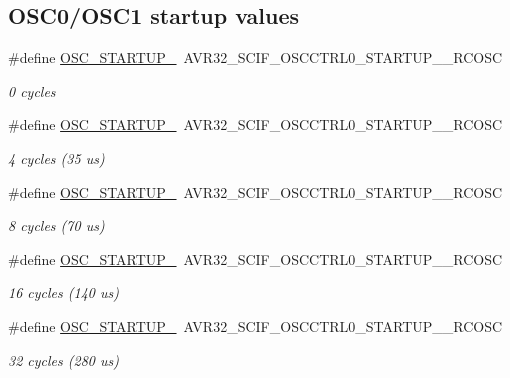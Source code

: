 \subsection*{\-O\-S\-C0/\-O\-S\-C1 startup values}
\begin{DoxyCompactItemize}
\item 
\#define \hyperlink{group__osc__group_ga9ae6e8400cfa38e2206501d313df0bd7}{\-O\-S\-C\-\_\-\-S\-T\-A\-R\-T\-U\-P\-\_}~\-A\-V\-R32\-\_\-\-S\-C\-I\-F\-\_\-\-O\-S\-C\-C\-T\-R\-L0\-\_\-\-S\-T\-A\-R\-T\-U\-P\-\_\-\_\-\-R\-C\-O\-S\-C
\begin{DoxyCompactList}\small\item\em 0 cycles \end{DoxyCompactList}\item 
\#define \hyperlink{group__osc__group_ga5b853a028994f1548b76f674f60ca8d3}{\-O\-S\-C\-\_\-\-S\-T\-A\-R\-T\-U\-P\-\_}~\-A\-V\-R32\-\_\-\-S\-C\-I\-F\-\_\-\-O\-S\-C\-C\-T\-R\-L0\-\_\-\-S\-T\-A\-R\-T\-U\-P\-\_\-\_\-\-R\-C\-O\-S\-C
\begin{DoxyCompactList}\small\item\em 4 cycles (35 us) \end{DoxyCompactList}\item 
\#define \hyperlink{group__osc__group_gac88d172ded7ef205fde1567b78dcc3aa}{\-O\-S\-C\-\_\-\-S\-T\-A\-R\-T\-U\-P\-\_}~\-A\-V\-R32\-\_\-\-S\-C\-I\-F\-\_\-\-O\-S\-C\-C\-T\-R\-L0\-\_\-\-S\-T\-A\-R\-T\-U\-P\-\_\-\_\-\-R\-C\-O\-S\-C
\begin{DoxyCompactList}\small\item\em 8 cycles (70 us) \end{DoxyCompactList}\item 
\#define \hyperlink{group__osc__group_ga3245296734ccf0c391cf20b231099548}{\-O\-S\-C\-\_\-\-S\-T\-A\-R\-T\-U\-P\-\_}~\-A\-V\-R32\-\_\-\-S\-C\-I\-F\-\_\-\-O\-S\-C\-C\-T\-R\-L0\-\_\-\-S\-T\-A\-R\-T\-U\-P\-\_\-\_\-\-R\-C\-O\-S\-C
\begin{DoxyCompactList}\small\item\em 16 cycles (140 us) \end{DoxyCompactList}\item 
\#define \hyperlink{group__osc__group_ga0477d5351f45b12894306923d17c9a9f}{\-O\-S\-C\-\_\-\-S\-T\-A\-R\-T\-U\-P\-\_}~\-A\-V\-R32\-\_\-\-S\-C\-I\-F\-\_\-\-O\-S\-C\-C\-T\-R\-L0\-\_\-\-S\-T\-A\-R\-T\-U\-P\-\_\-\_\-\-R\-C\-O\-S\-C
\begin{DoxyCompactList}\small\item\em 32 cycles (280 us) \end{DoxyCompactList}\item 

\end{DoxyCompactItemize}
